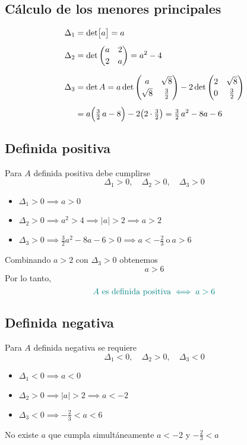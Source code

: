 \documentclass{article}
\begin{document}
\subsection*{Cálculo de los menores principales}

\[
\begin{aligned}
\Delta_1 &= \det\bigl[a\bigr] = a\\[4pt]
\Delta_2 &= \det\begin{pmatrix}a & 2\\[2pt]2 & a\end{pmatrix}
           = a^2 - 4\\[6pt]
\Delta_3 &= \det A
           = a\det\begin{pmatrix}a & \sqrt{8}\\[2pt]\sqrt{8} & \tfrac32\end{pmatrix}
             - 2\det\begin{pmatrix}2 & \sqrt{8}\\[2pt]0 & \tfrac32\end{pmatrix}\\[4pt]
         &= a\Bigl(\tfrac32\,a - 8\Bigr) - 2\bigl(2\cdot\tfrac32\bigr)
           = \tfrac32\,a^2 - 8a - 6
\end{aligned}
\]

\subsection*{Definida positiva}

Para \(A\) definida positiva debe cumplirse
\[
\Delta_1>0,\quad \Delta_2>0,\quad \Delta_3>0
\]
\begin{itemize}
  \item \(\Delta_1>0 \implies a>0\)
  \item \(\Delta_2>0 \implies a^2>4 \implies |a|>2 \implies a>2\)
  \item \(\Delta_3>0 \implies \tfrac32a^2 -8a -6>0 \implies a<-\tfrac23\ \text{o}\ a>6\)
\end{itemize}
Combinando \(a>2\) con \(\Delta_3>0\) obtenemos
\[
a>6
\]
Por lo tanto,
\[
\color{teal}
A\text{ es definida positiva} \iff a>6
\]

\subsection*{Definida negativa}

Para \(A\) definida negativa se requiere
\[
\Delta_1<0,\quad \Delta_2>0,\quad \Delta_3<0
\]
\begin{itemize}
  \item \(\Delta_1<0 \implies a<0\)
  \item \(\Delta_2>0 \implies |a|>2 \implies a<-2\)
  \item \(\Delta_3<0 \implies -\tfrac23 < a < 6\)
\end{itemize}
No existe \(a\) que cumpla simultáneamente \(a<-2\) y \(-\tfrac23<a\)
\end{document}
